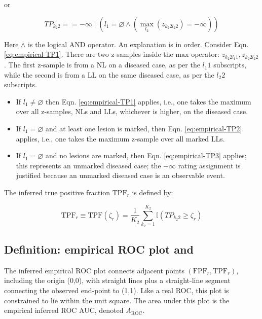 \documentclass[
]{book}
\begin{document}
or

\begin{equation}
TP_{k_2 2} = = -\infty \mid \left ( l_1 = \varnothing \land\left ( \max_{l_2}{\left (z_{k_2 2 l_2 2}  \right )} = -\infty  \right )  \right )
\label{eq:empirical-TP3}
\end{equation}

Here \(\land\) is the logical AND operator. An explanation is in order. Consider Eqn. \eqref{eq:empirical-TP1}. There are two z-samples inside the \(\text{max}\) operator: \(z_{k_2 2 l_1 1} ,z_{k_2 2 l_2 2}\). The first z-sample is from a NL on a diseased case, as per the \(l_1 1\) subscripts, while the second is from a LL on the same diseased case, as per the \(l_2 2\) subscripts.

\begin{itemize}
\item
  If \(l_1 \neq \varnothing\) then Eqn. \eqref{eq:empirical-TP1} applies, i.e., one takes the maximum over all z-samples, NLs and LLs, whichever is higher, on the diseased case.
\item
  If \(l_1 = \varnothing\) and at least one lesion is marked, then Eqn. \eqref{eq:empirical-TP2} applies, i.e., one takes the maximum z-sample over all marked LLs.
\item
  If \(l_1 = \varnothing\) and no lesions are marked, then Eqn. \eqref{eq:empirical-TP3} applies; this represents an unmarked diseased case; the \(-\infty\) rating assignment is justified because an unmarked diseased case is an observable event.
\end{itemize}

The inferred true positive fraction \(\text{TPF}_r\) is defined by:

\begin{equation}
\text{TPF}_r \equiv \text{TPF}(\zeta_r) = \frac{1}{K_2}\sum_{k_2=1}^{K_2} \mathbb{I}\left ( TP_{k_2 2} \geq \zeta_r \right )
\label{eq:empirical-TPF}
\end{equation}

\hypertarget{empirical-definition-empirical-auc-roc}{%
\subsection{Definition: empirical ROC plot and}\label{empirical-definition-empirical-auc-roc}}

The inferred empirical ROC plot connects adjacent points \(\left( \text{FPF}_r, \text{TPF}_r \right )\), including the origin (0,0), with straight lines plus a straight-line segment connecting the observed end-point to (1,1). Like a real ROC, this plot is constrained to lie within the unit square. The area under this plot is the empirical inferred ROC AUC, denoted \(A_{\text{ROC}}\).
\end{document}
